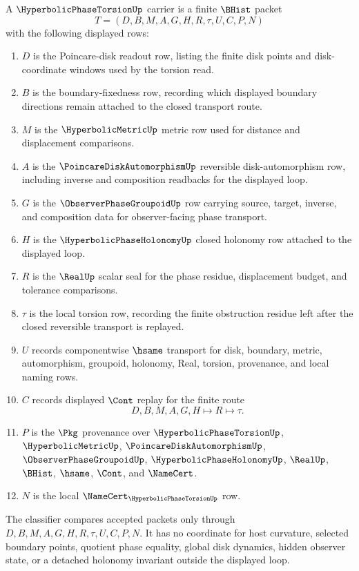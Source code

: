 \begin{definition}
\label{def:hyperbolic-phase-torsion-carrier}
A $\HyperbolicPhaseTorsionUp$ carrier is a finite $\BHist$ packet
$$
T=(D,B,M,A,G,H,R,\tau,U,C,P,N)
$$
with the following displayed rows:
\begin{enumerate}
\item $D$ is the Poincare-disk readout row, listing the finite disk points and disk-coordinate windows used by the torsion read.
\item $B$ is the boundary-fixedness row, recording which displayed boundary directions remain attached to the closed transport route.
\item $M$ is the $\HyperbolicMetricUp$ metric row used for distance and displacement comparisons.
\item $A$ is the $\PoincareDiskAutomorphismUp$ reversible disk-automorphism row, including inverse and composition readbacks for the displayed loop.
\item $G$ is the $\ObserverPhaseGroupoidUp$ row carrying source, target, inverse, and composition data for observer-facing phase transport.
\item $H$ is the $\HyperbolicPhaseHolonomyUp$ closed holonomy row attached to the displayed loop.
\item $R$ is the $\RealUp$ scalar seal for the phase residue, displacement budget, and tolerance comparisons.
\item $\tau$ is the local torsion row, recording the finite obstruction residue left after the closed reversible transport is replayed.
\item $U$ records componentwise $\hsame$ transport for disk, boundary, metric, automorphism, groupoid, holonomy, Real, torsion, provenance, and local naming rows.
\item $C$ records displayed $\Cont$ replay for the finite route
$$
D,B,M,A,G,H \longmapsto R \longmapsto \tau .
$$
\item $P$ is the $\Pkg$ provenance over $\HyperbolicPhaseTorsionUp$, $\HyperbolicMetricUp$, $\PoincareDiskAutomorphismUp$, $\ObserverPhaseGroupoidUp$, $\HyperbolicPhaseHolonomyUp$, $\RealUp$, $\BHist$, $\hsame$, $\Cont$, and $\NameCert$.
\item $N$ is the local $\NameCert_{\HyperbolicPhaseTorsionUp}$ row.
\end{enumerate}
The classifier compares accepted packets only through $D,B,M,A,G,H,R,\tau,U,C,P,N$. It has no coordinate for host curvature, selected boundary points, quotient phase equality, global disk dynamics, hidden observer state, or a detached holonomy invariant outside the displayed loop.
\end{definition}

